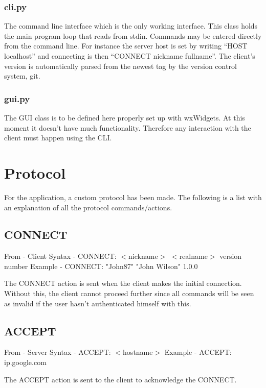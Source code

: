 \documentclass[12pt]{rapport}
\begin{document}
\subsubsection*{cli.py}
The command line interface which is the only working interface. This
class holds the main program loop that reads from stdin. Commands may
be entered directly from the command line. For instance the server
host is set by writing ``HOST localhost'' and connecting is then
``CONNECT nickname fullname''. The client's version is automatically
parsed from the newest tag by the version control system, git.
\subsubsection*{gui.py}
The GUI class is to be defined here properly set up with wxWidgets. At
this moment it doesn't have much functionality. Therefore any
interaction with the client must happen using the CLI.

\section*{Protocol}
For the application, a custom protocol has been made. The following is
a list with an explanation of all the protocol commands/actions.

\subsection*{CONNECT}
From    - Client\newline
Syntax  - CONNECT: $<$nickname$>$ $<$realname$>$ version number\newline
Example - CONNECT: "John87" "John Wilson" 1.0.0\newline

\noindent The CONNECT action is sent when the client makes the initial
connection. Without this, the client cannot proceed further since all
commands will be seen as invalid if the user hasn't authenticated
himself with this.

\subsection*{ACCEPT}
From    - Server\newline
Syntax  - ACCEPT: $<$hostname$>$\newline
Example - ACCEPT: ip.google.com\newline

\noindent The ACCEPT action is sent to the client to acknowledge the
CONNECT.
\end{document}
